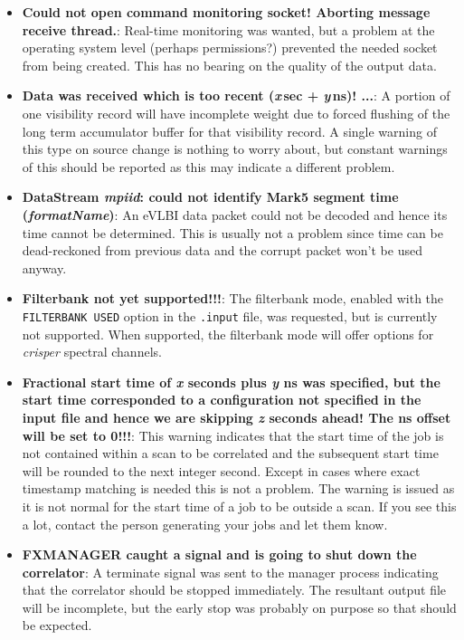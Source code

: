 \begin{itemize}
\item {\bf Could not open command monitoring socket! Aborting message receive thread.}:
Real-time monitoring was wanted, but a problem at the operating system level (perhaps permissions?) prevented the needed socket from being created.
This has no bearing on the quality of the output data.

\item {\bf Data was received which is too recent ({\it x}\,sec + {\it y}\,ns)! ...}:
A portion of one visibility record will have incomplete weight due to forced flushing of the long term accumulator buffer for that visibility record.
A single warning of this type on source change is nothing to worry about, but constant warnings of this should be reported as this may indicate a different problem.

\item {\bf DataStream {\it mpiid}: could not identify Mark5 segment time ({\it formatName})}:
An eVLBI data packet could not be decoded and hence its time cannot be determined.
This is usually not a problem since time can be dead-reckoned from previous data and the corrupt packet won't be used anyway.

\item {\bf Filterbank not yet supported!!!}:
The filterbank mode, enabled with the {\tt FILTERBANK USED} option in the {\tt .input} file, was requested, but is currently not supported.
When supported, the filterbank mode will offer options for {\em crisper} spectral channels.

\item {\bf Fractional start time of {\it x} seconds plus {\it y} ns was specified, but the start time corresponded to a configuration not specified in the input file and hence we are skipping {\it z} seconds ahead! The ns offset will be set to 0!!!}:
This warning indicates that the start time of the job is not contained within a scan to be correlated and the subsequent start time will be rounded to the next integer second.
Except in cases where exact timestamp matching is needed this is not a problem.
The warning is issued as it is not normal for the start time of a job to be outside a scan.
If you see this a lot, contact the person generating your jobs and let them know.

\item {\bf FXMANAGER caught a signal and is going to shut down the correlator}:
A terminate signal was sent to the manager process indicating that the correlator should be stopped immediately.
The resultant output file will be incomplete, but the early stop was probably on purpose so that should be expected.


\end{itemize}
